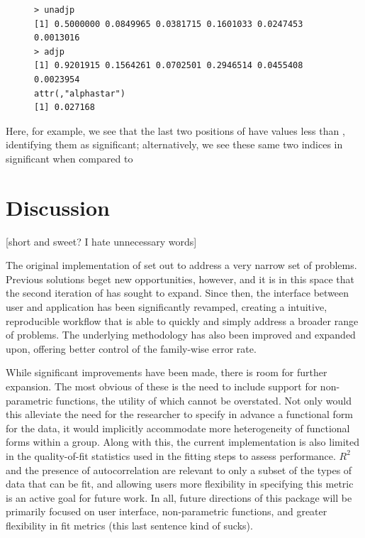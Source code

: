 \begin{singlespace}
\begin{figure}[H]
\centering
\begin{BVerbatim}
> unadjp
[1] 0.5000000 0.0849965 0.0381715 0.1601033 0.0247453 0.0013016
> adjp
[1] 0.9201915 0.1564261 0.0702501 0.2946514 0.0455408 0.0023954
attr(,"alphastar")
[1] 0.027168
\end{BVerbatim}
\end{figure}
\end{singlespace}

Here, for example, we see that the last two positions of  have values less than , identifying them as significant; alternatively, we see these same two indices in  significant when compared to 

\section{Discussion}

[short and sweet? I hate unnecessary words]

The original implementation of  set out to address a very narrow set of problems. Previous solutions beget new opportunities, however, and it is in this space that the second iteration of  has sought to expand. Since then, the interface between user and application has been significantly revamped, creating a intuitive, reproducible workflow that is able to quickly and simply address a broader range of problems. The underlying methodology has also been improved and expanded upon, offering better control of the family-wise error rate.

While significant improvements have been made, there is room for further expansion. The most obvious of these is the need to include support for non-parametric functions, the utility of which cannot be overstated. Not only would this alleviate the need for the researcher to specify in advance a functional form for the data, it would implicitly accommodate more heterogeneity of functional forms within a group. Along with this, the current implementation is also limited in the quality-of-fit statistics used in the fitting steps to assess performance. $R^2$ and the presence of autocorrelation are relevant to only a subset of the types of data that can be fit, and allowing users more flexibility in specifying this metric is an active goal for future work. In all, future directions of this package will be primarily focused on user interface, non-parametric functions, and greater flexibility in fit metrics (this last sentence kind of sucks).



